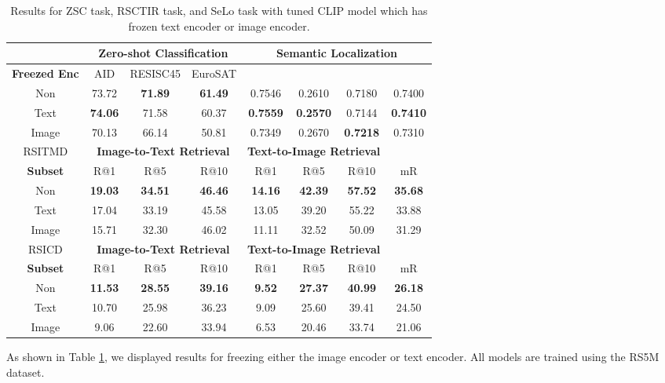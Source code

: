 \documentclass[journal]{IEEEtran}
\begin{document}
\begin{table}[ht]
\caption{Results for ZSC task, RSCTIR task, and SeLo task with tuned CLIP model which has frozen text encoder or image encoder.}
\label{table:freeze_encoder}
\footnotesize
\setlength{\tabcolsep}{1.0pt}
\begin{tabular}{cccccccc}
\toprule
& \multicolumn{3}{c}{\textbf{Zero-shot Classification}} & \multicolumn{4}{c}{\textbf{Semantic Localization}} \\
\midrule
\textbf{Freezed Enc} & AID & RESISC45 & EuroSAT &  &  &  &  \\
\midrule
 Non & 73.72 & \textbf{71.89} & \textbf{61.49} & 0.7546 & 0.2610 &0.7180 &0.7400 \\
 Text & \textbf{74.06} & 71.58 & 60.37 & \textbf{0.7559} & \textbf{0.2570} &0.7144 & \textbf{0.7410}	 \\
 Image & 70.13 & 66.14 &50.81 &0.7349	&0.2670	&\textbf{0.7218}	&0.7310	  \\
\midrule
\midrule
RSITMD & \multicolumn{3}{c}{\textbf{Image-to-Text Retrieval}} & \multicolumn{3}{c}{\textbf{Text-to-Image Retrieval}} & \\
\midrule
\textbf{Subset} &  {R@1} & {R@5} & {R@10} & {R@1} & {R@5} & {R@10} & {mR} \\
 \midrule
 Non & \textbf{19.03} & 	\textbf{34.51} & 	\textbf{46.46}	 & \textbf{14.16}	&  \textbf{42.39} & 	\textbf{57.52}  & 	\textbf{35.68}\\
 Text &17.04	&33.19	&45.58	&13.05	&39.20	&55.22	&33.88\\
 Image  &15.71	&32.30	&46.02	&11.11	&32.52	&50.09	&31.29	\\
\midrule
RSICD & \multicolumn{3}{c}{\textbf{Image-to-Text Retrieval}} & \multicolumn{3}{c}{\textbf{Text-to-Image Retrieval}} & \\
\midrule
\textbf{Subset} &  {R@1} & {R@5} & {R@10} & {R@1} & {R@5} & {R@10} & {mR} \\
 \midrule
 Non & \textbf{11.53}  &	\textbf{28.55} 	& \textbf{39.16}  & 	\textbf{9.52}  & 	\textbf{27.37} 	& \textbf{40.99}  &	\textbf{26.18} \\
 Text &10.70	&25.98	&36.23	&9.09	&25.60	&39.41	&24.50\\
 Image  &9.06	&22.60	&33.94	&6.53	&20.46	&33.74	&21.06 \\
\bottomrule
\end{tabular}
\end{table}

As shown in Table \ref{table:freeze_encoder}, we displayed results for freezing either the image encoder or text encoder. All models are trained using the RS5M dataset. 
\end{document}
